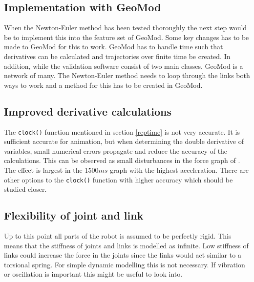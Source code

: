 \subsection{Implementation with GeoMod}
When the Newton-Euler method has been tested thoroughly the next step would be to implement this into the feature set of GeoMod. Some key changes has to be made to GeoMod for this to work. GeoMod has to handle time such that derivatives can be calculated and trajectories over finite time be created. In addition, while the validation software consist of two main classes, GeoMod is a network of many. The Newton-Euler method needs to loop through the links both ways to work and a method for this has to be created in GeoMod.

\subsection{Improved derivative calculations}

The \texttt{clock()} function mentioned in section \ref{reptime} is not very accurate. It is sufficient accurate for animation, but when determining the double derivative of variables, small numerical errors propagate and reduce the accuracy of the calculations. This can be observed as small disturbances in the force graph of . The effect is largest in the $1500ms$ graph with the highest acceleration. There are other options to the \texttt{clock()} function with higher accuracy which should be studied closer.

\subsection{Flexibility of joint and link}

Up to this point all parts of the robot is assumed to be perfectly rigid. This means that the stiffness of joints and links is modelled as infinite. Low stiffness of links could increase the force in the joints since the links would act similar to a torsional spring. For simple dynamic modelling this is not necessary. If vibration or oscillation is important this might be useful to look into.
